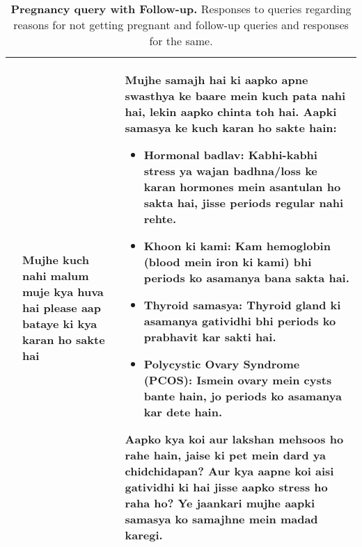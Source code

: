 \begin{table*}[ht]
\begin{tabular}{>{\raggedright\arraybackslash}p{2cm} p{2.5cm} p{9.5cm}}
\cmidrule{2-3}
& Mujhe kuch nahi malum muje kya huva hai please aap bataye ki kya karan ho sakte hai & Mujhe samajh hai ki aapko apne swasthya ke baare mein kuch pata nahi hai, lekin aapko chinta toh hai. Aapki samasya ke kuch karan ho sakte hain:
\begin{itemize}
    \item Hormonal badlav: Kabhi-kabhi stress ya wajan badhna/loss ke karan hormones mein asantulan ho sakta hai, jisse periods regular nahi rehte.
    \item Khoon ki kami: Kam hemoglobin (blood mein iron ki kami) bhi periods ko asamanya bana sakta hai.
    \item Thyroid samasya: Thyroid gland ki asamanya gatividhi bhi periods ko prabhavit kar sakti hai.
    \item Polycystic Ovary Syndrome (PCOS): Ismein ovary mein cysts bante hain, jo periods ko asamanya kar dete hain.
\end{itemize}
Aapko kya koi aur lakshan mehsoos ho rahe hain, jaise ki pet mein dard ya chidchidapan? Aur kya aapne koi aisi gatividhi ki hai jisse aapko stress ho raha ho? Ye jaankari mujhe aapki samasya ko samajhne mein madad karegi. \\
\bottomrule
\end{tabular}
\caption{\textbf{Pregnancy query with Follow-up.} Responses to queries regarding reasons for not getting pregnant and follow-up queries and responses for the same.}
\label{tab:reasons}
\end{table*}

